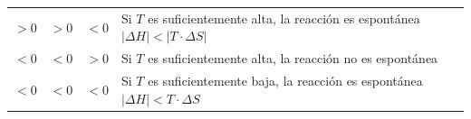 \begin{table}[H]
\begin{tabular}{@{}cccl@{}}
        \(> 0\) & \(\displaystyle > 0\) & \(\displaystyle < 0\) & Si \( T \) es suficientemente alta, la reacción es espontánea \( |\Delta H| < |T\cdot \Delta S|\) \\[3pt]
        \(< 0\) & \(\displaystyle < 0\) & \(\displaystyle > 0\) & Si \( T \) es suficientemente alta, la reacción no es espontánea \\[3pt]
        \(< 0\) & \(\displaystyle < 0\) & \(\displaystyle < 0\) & Si \( T \) es suficientemente baja, la reacción es espontánea \( |\Delta H| < T\cdot \Delta S\) \\
        \bottomrule
    \end{tabular}
\end{table}


